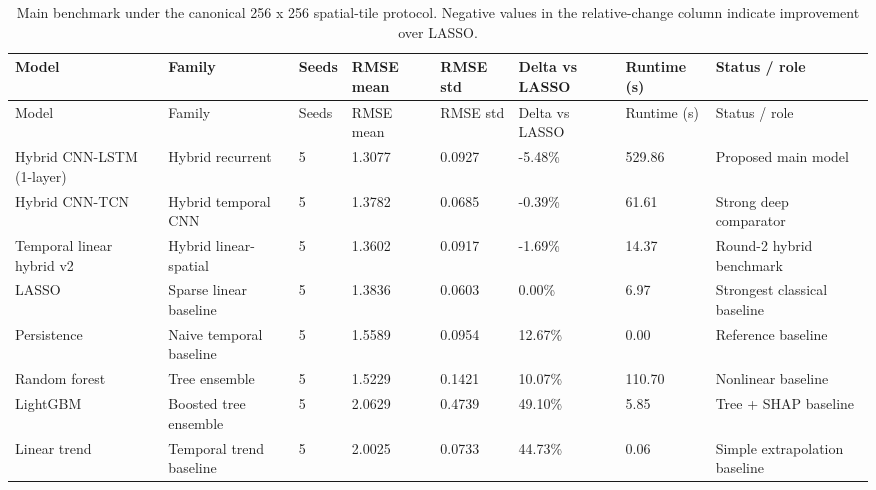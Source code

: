 \documentclass[11pt]{article}
\begin{document}
\begin{longtable}{p{3.3cm}p{2.4cm}p{1.1cm}p{1.3cm}p{1.3cm}p{1.6cm}p{1.6cm}p{3.0cm}}
\caption{Main benchmark under the canonical 256 x 256 spatial-tile protocol. Negative values in the relative-change column indicate improvement over LASSO.}\label{tab:t2}\\
\toprule
Model & Family & Seeds & RMSE mean & RMSE std & Delta vs LASSO & Runtime (s) & Status / role \\
\midrule
\endfirsthead
\toprule
Model & Family & Seeds & RMSE mean & RMSE std & Delta vs LASSO & Runtime (s) & Status / role \\
\midrule
\endhead
Hybrid CNN-LSTM (1-layer) & Hybrid recurrent & 5 & 1.3077 & 0.0927 & -5.48\% & 529.86 & Proposed main model \\
Hybrid CNN-TCN & Hybrid temporal CNN & 5 & 1.3782 & 0.0685 & -0.39\% & 61.61 & Strong deep comparator \\
Temporal linear hybrid v2 & Hybrid linear-spatial & 5 & 1.3602 & 0.0917 & -1.69\% & 14.37 & Round-2 hybrid benchmark \\
LASSO & Sparse linear baseline & 5 & 1.3836 & 0.0603 & 0.00\% & 6.97 & Strongest classical baseline \\
Persistence & Naive temporal baseline & 5 & 1.5589 & 0.0954 & 12.67\% & 0.00 & Reference baseline \\
Random forest & Tree ensemble & 5 & 1.5229 & 0.1421 & 10.07\% & 110.70 & Nonlinear baseline \\
LightGBM & Boosted tree ensemble & 5 & 2.0629 & 0.4739 & 49.10\% & 5.85 & Tree + SHAP baseline \\
Linear trend & Temporal trend baseline & 5 & 2.0025 & 0.0733 & 44.73\% & 0.06 & Simple extrapolation baseline \\
\bottomrule
\end{longtable}
\end{document}
